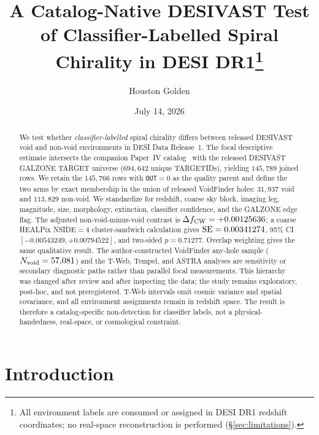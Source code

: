 \documentclass[aps,prd,twocolumn,superscriptaddress,showpacs,preprintnumbers,nofootinbib,longbibliography,floatfix]{revtex4-2}
\begin{document}
\title{A Catalog-Native DESIVAST Test of Classifier-Labelled Spiral Chirality in DESI DR1\protect\footnote{All environment labels are consumed or assigned in DESI DR1 redshift coordinates; no real-space reconstruction is performed (\S\ref{sec:limitations}).}}

\author{Houston Golden}

\date{July 14, 2026}

\begin{abstract}
We test whether \emph{classifier-labelled} spiral chirality differs
between released DESIVAST~\cite{DESIVAST2025} void and non-void
environments in DESI Data Release~1. The focal descriptive estimate
intersects the companion Paper~IV catalog~\cite{golden_chirality_2026}
with the released DESIVAST GALZONE TARGET universe ($694{,}642$ unique
TARGETIDs), yielding $145{,}789$ joined rows. We retain the $145{,}766$
rows with \texttt{OUT}$=0$ as the quality parent and define the two arms
by exact membership in the union of released VoidFinder holes:
$31{,}937$ void and $113{,}829$ non-void. We standardize for redshift,
coarse sky block, imaging leg, magnitude, size, morphology, extinction,
classifier confidence, and the GALZONE edge flag. The adjusted
non-void-minus-void contrast is
$\Delta f_{\rm CW}=+0.00125636$; a coarse HEALPix NSIDE$=4$
cluster-sandwich calculation gives ${\rm SE}=0.00341274$, 95\% CI
$[-0.00543249,+0.00794522]$, and two-sided $p=0.71277$. Overlap
weighting gives the same qualitative result. The author-constructed
VoidFinder any-hole sample ($N_{\rm void}=57{,}081$) and the T-Web,
Tempel, and ASTRA analyses are sensitivity or secondary diagnostic
paths rather than parallel focal measurements. This hierarchy was changed
after review and after inspecting the data; the study remains
exploratory, post-hoc, and not preregistered. T-Web intervals omit
cosmic variance and spatial covariance, and all environment assignments
remain in redshift space. The result is therefore a catalog-specific
non-detection for classifier labels, not a physical-handedness,
real-space, or cosmological constraint.
\end{abstract}
\maketitle

\section{Introduction}\label{sec:intro}
\end{document}
